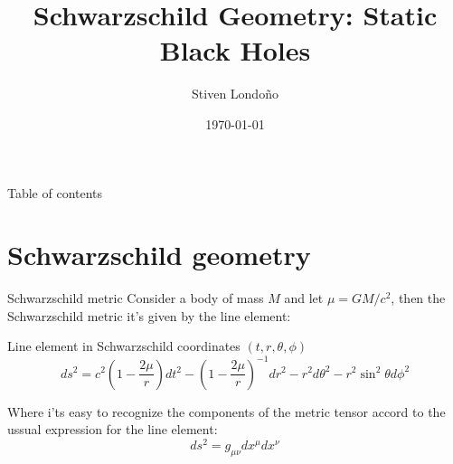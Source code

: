 \documentclass[xcolor=dvipsnames]{beamer}
\title[Schwarzschild geometry]{Schwarzschild Geometry: Static Black Holes}
\date{\today}
\author[Universidad del Valle]{Stiven Londoño}
\institute[]{Universidad del Valle \\ Departamento de física}
\begin{document}
	
	\begin{frame}
		\titlepage
	\end{frame}
	
	\begin{frame}{Table of contents}
    \tableofcontents
	\end{frame}
	
	
\section{Schwarzschild geometry}

\begin{frame}{Schwarzschild metric}
Consider a body of mass $M$ and let $\mu = GM/c^2$, then the Schwarzschild metric it's given by the line element:

\begin{block}{Line element in Schwarzschild coordinates $(t,r,\theta,\phi)$ }
\begin{equation}
	ds^2 = c^2 \left( 1 - \frac{2\mu}{r}\right) dt^2 - \left( 1 - \frac{2\mu}{r}\right)^{-1} dr^2 - r^2 d\theta^2 - r^2 \sin^2 \theta d\phi^2 \label{1}
\end{equation}
\end{block}
Where i'ts easy to recognize the components of the metric tensor accord to the ussual expression for the line element:
\begin{equation*}
    ds^2 = g_{\mu \nu} dx^\mu dx^\nu
\end{equation*}
\end{frame}
\end{document}
